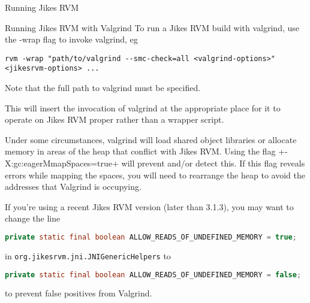 \begin{chapter}{Running Jikes RVM}
\begin{section}{Running Jikes RVM with Valgrind}
To run a Jikes RVM build with valgrind, use the -wrap flag to invoke valgrind, eg
\begin{lstlisting}
rvm -wrap "path/to/valgrind --smc-check=all <valgrind-options>" <jikesrvm-options> ...
\end{lstlisting}

Note that the full path to valgrind must be specified.

This will insert the invocation of valgrind at the appropriate place for it to operate on Jikes RVM proper rather than a wrapper script. 

Under some circumstances, valgrind will load shared object libraries or allocate memory in areas of the heap that conflict with Jikes RVM.  Using the flag \spverb+-X:gc:eagerMmapSpaces=true+ will prevent and/or detect this.  If this flag reveals errors while mapping the spaces, you will need to rearrange the heap to avoid the addresses that Valgrind is occupying.

If you're using a recent Jikes RVM version (later than 3.1.3), you may want to change the line
\begin{lstlisting}[language=Java]
private static final boolean ALLOW_READS_OF_UNDEFINED_MEMORY = true;
\end{lstlisting}

in \texttt{org.jikesrvm.jni.JNIGenericHelpers} to

\begin{lstlisting}[language=Java]
private static final boolean ALLOW_READS_OF_UNDEFINED_MEMORY = false;
\end{lstlisting}

to prevent false positives from Valgrind.

\end{section}

\end{chapter}
